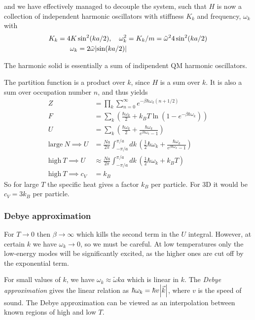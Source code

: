 \documentclass[a4paper, english, 12pt]{article}
\newcommand{\closed}[1]{\left( #1 \right)}
\begin{document}
\begin{multicols*}{2}
and we have effectively managed to decouple the system, such that $H$ is now a collection of independent harmonic oscillators with stiffness $K_k$ and frequency, $\omega_k$ with 
\begin{align*}
    K_k = 4K \sin^2(ka/2),\quad \omega_k^2 &= K_k/m = \tilde{\omega}^2 4\sin^2(ka/2) \\
    \omega_k = 2 \tilde{\omega}\abs{\sin(ka/2)}
\end{align*}

The harmonic solid is essentially a sum of indipendent QM harmonic oscillators. 

The partition function is a product over $k$, since $H$ is a sum over $k$. It is also a sum over occupation number $n$, and thus yields 
\begin{align*}
    Z &= \prod_k \sum_{n=0}^\infty e^{-\beta \hbar \omega_k (n+1/2)} \\ 
    F &= \sum_k \closed{\frac{\hbar \omega_k}{2} + k_B T \ln\closed{1-e^{-\beta \hbar \omega_k}} } \\
    U &= \sum_k \closed{\frac{\hbar \omega_k}{2} + \frac{\hbar \omega_k}{e^{\beta \hbar \omega_k} - 1} } \\ 
    \text{large}\: N \implies U &= \frac{Na}{2\pi} \int_{-\pi/a}^{\pi/a} dk\, \closed{\frac{1}{2}\hbar \omega_k + \frac{\hbar \omega_k}{e^{\beta \hbar \omega_k} - 1} } \\ 
    \text{high}\: T \implies U &\approx \frac{Na}{2\pi} \int_{-\pi/a}^{\pi/a} dk\, \closed{\frac{1}{2}\hbar \omega_k + k_B T} \\ 
    \text{high}\: T \implies c_V &= k_B
\end{align*}
So for large $T$ the specific heat gives a factor $k_B$ per particle. For 3D it would be $c_V=3k_B$ per particle. 

\subsubsection*{Debye approximation}
For $T\to0$ then $\beta\to\infty$ which kills the second term in the $U$ integral. However, at certain $k$ we have $\omega_k\to0$, so we must be careful. At low temperatures only the low-energy modes will be significantly excited, as the higher ones are cut off by the exponential term.  

For small values of $k$, we have $\omega_k\approx \tilde{\omega} ka$ which is linear in $k$. The \textit{Debye approximation} gives the linear relation as $\hbar\omega_k=\hbar v \abs{\vec{k}}$, where $v$ is the speed of sound. The Debye approximation can be viewed as an interpolation between known regions of high and low $T$. 


\end{multicols*}
\end{document}
